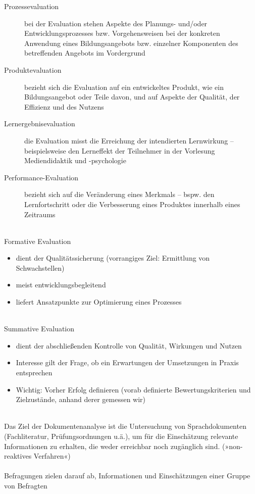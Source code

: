 \documentclass[a4paper]{article}
\begin{document}
\begin{description}
	\item[Prozessevaluation] bei der Evaluation stehen Aspekte des Planungs- und/oder Entwicklungsprozesses bzw. Vorgehensweisen bei der konkreten Anwendung eines Bildungsangebots bzw. einzelner Komponenten des betreffenden Angebots im Vordergrund
	\item[Produktevaluation] bezieht sich die Evaluation auf ein entwickeltes Produkt, wie ein Bildungsangebot oder Teile davon, und auf Aspekte der Qualität, der Effizienz und des Nutzens
	\item[Lernergebnisevaluation] die Evaluation misst die Erreichung der intendierten Lernwirkung – beispielsweise den Lerneffekt der Teilnehmer in der Vorlesung Mediendidaktik und -psychologie
	\item[Performance-Evaluation] bezieht sich auf die Veränderung eines Merkmals – bspw. den Lernfortschritt oder die Verbesserung eines Produktes innerhalb eines Zeitraums
\end{description}
~\\
Formative Evaluation
\begin{itemize}
	\item dient der Qualitätssicherung (vorrangiges Ziel: Ermittlung von Schwachstellen)
	\item meist entwicklungsbegleitend
	\item liefert Ansatzpunkte zur Optimierung eines Prozesses
\end{itemize}
~\\
Summative Evaluation
\begin{itemize}
	\item dient der abschließenden Kontrolle von Qualität, Wirkungen und Nutzen
	\item Interesse gilt der Frage, ob ein Erwartungen der Umsetzungen in Praxis
	entsprechen
	\item Wichtig: Vorher Erfolg definieren (vorab definierte Bewertungskriterien und
	Zielzustände, anhand derer gemessen wir)
\end{itemize}
~\\
Das Ziel der Dokumentenanalyse ist die Untersuchung von Sprachdokumenten (Fachliteratur,
Prüfungsordnungen u.ä.), um für die Einschätzung relevante Informationen zu erhalten, die weder
erreichbar noch zugänglich sind. (»non-reaktives Verfahren«)
~\\~\\
Befragungen zielen darauf ab, Informationen und Einschätzungen einer Gruppe von Befragten
\end{document}
